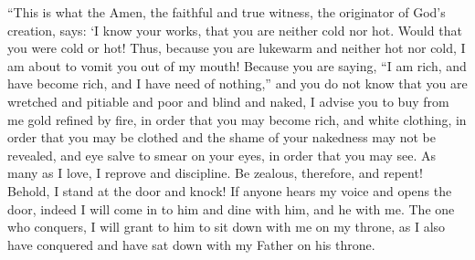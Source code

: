 \begin{biblechapter}
\verse “This is what the Amen, the faithful and true witness, the originator of God’s creation, says:
\verse ‘I know your works, that you are neither cold nor hot. Would that you were cold or hot!
\verse Thus, because you are lukewarm and neither hot nor cold, I am about to vomit you out of my mouth!
\verse Because you are saying, “I am rich, and have become rich, and I have need of nothing,” and you do not know that you are wretched and pitiable and poor and blind and naked,
\verse I advise you to buy from me gold refined by fire, in order that you may become rich, and white clothing, in order that you may be clothed and the shame of your nakedness may not be revealed, and eye salve to smear on your eyes, in order that you may see.
\verse As many as I love, I reprove and discipline. Be zealous, therefore, and repent!
\verse Behold, I stand at the door and knock! If anyone hears my voice and opens the door, indeed I will come in to him and dine with him, and he with me.
\verse The one who conquers, I will grant to him to sit down with me on my throne, as I also have conquered and have sat down with my Father on his throne.
\end{biblechapter}

